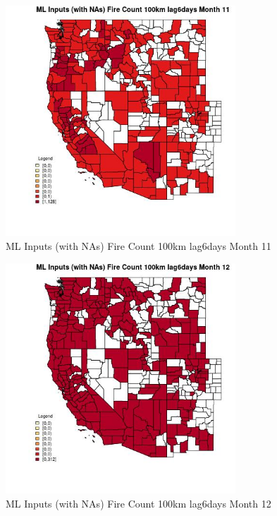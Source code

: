\begin{figure} 
\centering  
\includegraphics[width=0.77\textwidth]{Code_Outputs/Report_ML_input_PM25_Step4_part_e_de_duplicated_aves_compiled_2019-05-21wNAs_CountyFire_Count_100km_lag6daysmedianMonth11.jpg} 
\caption{\label{fig:Report_ML_input_PM25_Step4_part_e_de_duplicated_aves_compiled_2019-05-21wNAsCountyFire_Count_100km_lag6daysmedianMonth11}ML Inputs (with NAs) Fire Count 100km lag6days Month 11} 
\end{figure} 
 

\begin{figure} 
\centering  
\includegraphics[width=0.77\textwidth]{Code_Outputs/Report_ML_input_PM25_Step4_part_e_de_duplicated_aves_compiled_2019-05-21wNAs_CountyFire_Count_100km_lag6daysmedianMonth12.jpg} 
\caption{\label{fig:Report_ML_input_PM25_Step4_part_e_de_duplicated_aves_compiled_2019-05-21wNAsCountyFire_Count_100km_lag6daysmedianMonth12}ML Inputs (with NAs) Fire Count 100km lag6days Month 12} 
\end{figure} 
 

